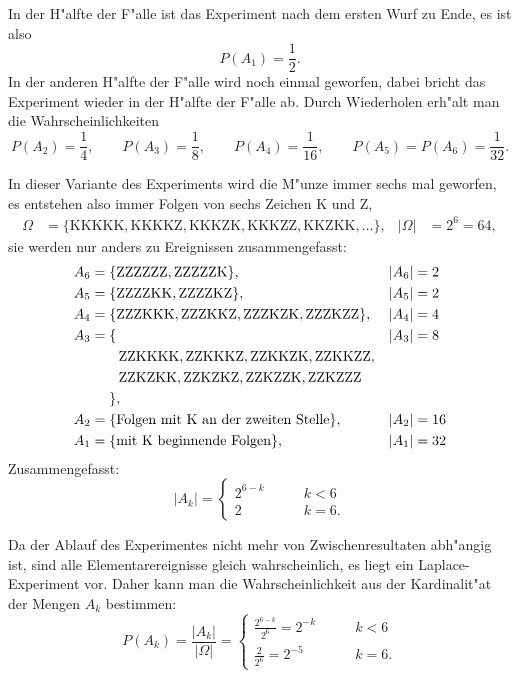 \begin{loesung}
\begin{teilaufgaben}
In der H"alfte der F"alle ist das Experiment nach dem ersten Wurf zu Ende,
es ist also
\[
P(A_1) = \frac12.
\]
In der anderen H"alfte der F"alle wird noch einmal geworfen, dabei bricht das 
Experiment wieder in der H"alfte der F"alle ab.
Durch Wiederholen erh"alt man die Wahrscheinlichkeiten
\[
P(A_2)=\frac14,\qquad
P(A_3)=\frac18,\qquad
P(A_4)=\frac1{16},\qquad
P(A_5)=P(A_6)=\frac1{32}.
\]
\item
In dieser Variante des Experiments wird die M"unze immer sechs mal geworfen,
es entstehen also immer Folgen von sechs Zeichen K und Z,
\begin{align*}
\Omega&=\{
\text{KKKKK},
\text{KKKKZ},
\text{KKKZK},
\text{KKKZZ},
\text{KKZKK},\dots
\},&|\Omega|&=2^6=64,
\end{align*}
sie werden nur anders zu Ereignissen zusammengefasst:
\begin{align*}
A_6&=\{\text{ZZZZZZ}, \text{ZZZZZK}\},&|A_6|&=2\\
A_5&=\{
\text{ZZZZKK},
\text{ZZZZKZ}
\},&|A_5|&=2\\
A_4&=\{
\text{ZZZKKK},
\text{ZZZKKZ},
\text{ZZZKZK},
\text{ZZZKZZ}
\},&|A_4|&=4\\
A_3&=\{
&|A_3|&=8\\
&\qquad
\text{ZZKKKK},
\text{ZZKKKZ},
\text{ZZKKZK},
\text{ZZKKZZ},\\
&\qquad\text{ZZKZKK},
\text{ZZKZKZ},
\text{ZZKZZK},
\text{ZZKZZZ}\\
&\phantom{\mathstrut=\mathstrut }\},\\
A_2&=\{\text{Folgen mit K an der zweiten Stelle}\},&|A_2|&=16\\
A_1&=\{\text{mit K beginnende Folgen}\},&|A_1|&=32\\
\end{align*}
Zusammengefasst:
\[
|A_k|=\begin{cases}
2^{6-k}&\qquad k<6\\
2&\qquad k=6.
\end{cases}
\]
\item
Da der Ablauf des Experimentes nicht mehr von Zwischenresultaten abh"angig ist,
sind alle Elementarereignisse gleich wahrscheinlich, es liegt ein Laplace-Experiment
vor.
Daher kann man die Wahrscheinlichkeit aus der Kardinalit"at der Mengen $A_k$
bestimmen:
\[
P(A_k)=\frac{|A_k|}{|\Omega|}
=\begin{cases}
\frac{2^{6-k}}{2^6}=2^{-k}&\qquad k<6\\
\frac{2}{2^6}=2^{-5}&\qquad k=6.
\end{cases}
\]
\item

\end{teilaufgaben}
\end{loesung}
